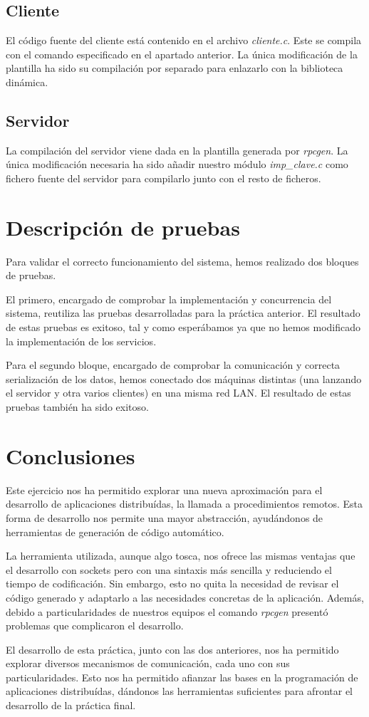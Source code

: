 \documentclass[]{article}
\begin{document}
\subsection{Cliente}
\label{subsec:cliente}
El código fuente del cliente está contenido en el archivo \textit{cliente.c}. Este se compila con el comando especificado en el apartado anterior. La única modificación de la plantilla ha sido su compilación por separado para enlazarlo con la biblioteca dinámica. 

\subsection{Servidor}
\label{subsec:compile_server}
La compilación del servidor viene dada en la plantilla generada por \textit{rpcgen}. La única modificación necesaria ha sido añadir nuestro módulo \textit{imp\_clave.c} como fichero fuente del servidor para compilarlo junto con el resto de ficheros. 

\section{Descripción de pruebas}
\label{sec:descripcion_de_pruebas}
Para validar el correcto funcionamiento del sistema, hemos realizado dos bloques de pruebas. 

El primero, encargado de comprobar la implementación y concurrencia del sistema, reutiliza las pruebas desarrolladas para la práctica anterior. El resultado de estas pruebas es exitoso, tal y como esperábamos ya que no hemos modificado la implementación de los servicios.

Para el segundo bloque, encargado de comprobar la comunicación y correcta serialización de los datos, hemos conectado dos máquinas distintas (una lanzando el servidor y otra varios clientes) en una misma red LAN. El resultado de estas pruebas también ha sido exitoso.

\section{Conclusiones}
\label{sec:conclusiones}
Este ejercicio nos ha permitido explorar una nueva aproximación para el desarrollo de aplicaciones distribuídas, la llamada a procedimientos remotos. Esta forma de desarrollo nos permite una mayor abstracción, ayudándonos de herramientas de generación de código automático. 

La herramienta utilizada, aunque algo tosca, nos ofrece las mismas ventajas que el desarrollo con sockets pero con una sintaxis más sencilla y reduciendo el tiempo de codificación. Sin embargo, esto no quita la necesidad de revisar el código generado y adaptarlo a las necesidades concretas de la aplicación. Además, debido a particularidades de nuestros equipos el comando \textit{rpcgen} presentó problemas que complicaron el desarrollo. 

El desarrollo de esta práctica, junto con las dos anteriores, nos ha permitido explorar diversos mecanismos de comunicación, cada uno con sus particularidades. Esto nos ha permitido afianzar las bases en la programación de aplicaciones distribuídas, dándonos las herramientas suficientes para afrontar el desarrollo de la práctica final. 
\end{document}
